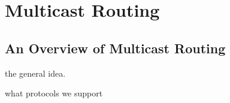 \chapter{Multicast Routing}
\label{multicast}
\section{An Overview of Multicast Routing}

the general idea.

what protocols we support
